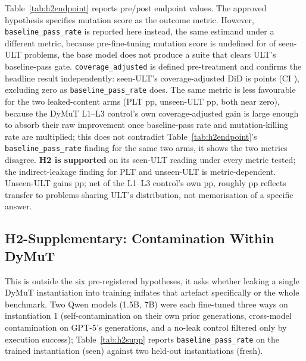 Table~\ref{tab:h2endpoint} reports pre/post endpoint values. The approved hypothesis specifies mutation score as the outcome metric. However, \texttt{baseline\_pass\_rate} is reported here instead, the same estimand under a different metric, because pre-fine-tuning mutation score is undefined for \HTwoPreMutkUndefined{} of \HTwoPreMutkTotal{} seen-ULT problems, the base model does not produce a suite that clears ULT's baseline-pass gate. \texttt{coverage\_adjusted} is defined pre-treatment and confirms the headline result independently: seen-ULT's coverage-adjusted DiD is \HTwoCovAdjSeenDid{} points (CI \HTwoCovAdjSeenDidCI{}), excluding zero as \texttt{baseline\_pass\_rate} does. The same metric is less favourable for the two leaked-content arms (PLT \HTwoCovAdjPltDid{}pp, unseen-ULT \HTwoCovAdjUnseenDid{}pp, both near zero), because the DyMuT L1--L3 control's own coverage-adjusted gain is large enough to absorb their raw improvement once baseline-pass rate and mutation-killing rate are multiplied; this does not contradict Table~\ref{tab:h2endpoint}'s \texttt{baseline\_pass\_rate} finding for the same two arms, it shows the two metrics disagree. \textbf{H2 is supported} on its seen-ULT reading under every metric tested; the indirect-leakage finding for PLT and unseen-ULT is metric-dependent. Unseen-ULT gains \HTwoUnseenGain{}pp; net of the L1--L3 control's own \HTwoLOneLThreeGain{}pp, roughly \HTwoUnseenNetOfControl{}pp reflects transfer to problems sharing ULT's distribution, not memorisation of a specific answer.

\subsection{H2-Supplementary: Contamination Within DyMuT}
\label{sec:results-h2supp}
This is outside the six pre-registered hypotheses, it asks whether leaking a single DyMuT instantiation into training inflates that artefact specifically or the whole benchmark. Two Qwen models (1.5B, 7B) were each fine-tuned three ways on instantiation 1 (self-contamination on their own prior generations, cross-model contamination on GPT-5's generations, and a no-leak control filtered only by execution success); Table~\ref{tab:h2supp} reports \texttt{baseline\_pass\_rate} on the trained instantiation (seen) against two held-out instantiations (fresh). %

